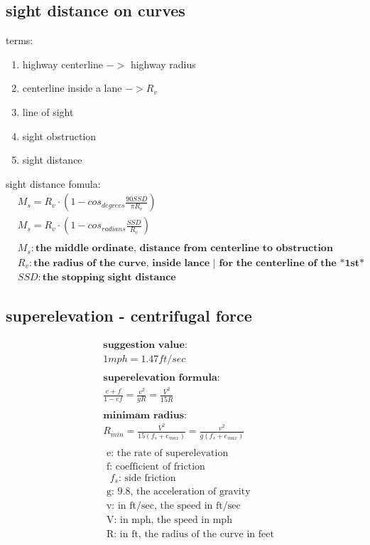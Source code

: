 \documentclass{article}
\begin{document}
  \subsection{sight distance on curves}
  terms:
  \begin{enumerate}
    \item highway centerline $->$ highway radius 
    \item centerline inside a lane $-> R_v $
    \item line of sight
    \item sight obstruction
    \item sight distance
  \end{enumerate}
    sight distance fomula:
  \begin{align*}
    & M_s = R_v \cdot (1 - cos_{degrees} \frac{90 SSD}{\pi R_v}) \\
    & M_s = R_v \cdot (1 - cos_{radians} \frac{SSD}{R_v}) \\
    \\
    & M_s: \textbf{the middle ordinate, distance from centerline to obstruction} \\
    & R_v: \textbf{the radius of the curve, inside lance | for the centerline of the *1st* lane}\\
    & SSD: \textbf{the stopping sight distance}
  \end{align*}

  \subsection{superelevation - centrifugal force}
  \begin{align*}
    & \textbf{suggestion value:} \\
    & 1 mph = 1.47 ft/sec \\
    \\
    & \textbf{superelevation formula:} \\
    & \frac{e + f}{1 - ef} = \frac{v^2}{gR} = \frac{V^2}{15R} \\
    \\
    & \textbf{minimam radius:} \\
    & R_{min} = \frac{V^2}{15(f_s + e_{max})} = \frac{v^2}{g(f_s + e_{max})} \\
    \\
    & \text{ e: the rate of superelevation} \\
    & \text{ f: coefficient of friction} \\
    & \text{ $f_s$: side friction} \\
    & \text{ g: 9.8, the acceleration of gravity} \\
    & \text{ v: in ft/sec, the speed in ft/sec} \\
    & \text{ V: in mph, the speed in mph} \\
    & \text{ R: in ft, the radius of the curve in feet} \\
  \end{align*}
\end{document}
